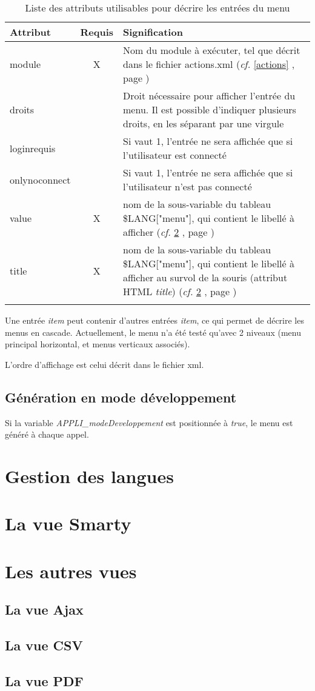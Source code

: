 \begin{longtable}{|p{2.5cm}|c|p{9cm}|}
\hline
\textbf{Attribut} & \textbf{Requis} & \textbf{Signification} \\
\hline
\endhead
module & X & Nom du module à exécuter, tel que décrit dans le fichier actions.xml (\textit{cf.} \ref{actions} \textit{\nameref{actions}}, page \pageref{actions})\\
 \hline
droits & & Droit nécessaire pour afficher l'entrée du menu. Il est possible d'indiquer plusieurs droits, en les séparant par une virgule\\
 \hline
loginrequis & & Si vaut 1, l'entrée ne sera affichée que si l'utilisateur est connecté \\
 \hline
onlynoconnect & & Si vaut 1, l'entrée ne sera affichée que si l'utilisateur n'est pas connecté\\
 \hline
value & X & nom de la sous-variable du tableau \$LANG["menu"], qui contient le libellé à afficher (\textit{cf.} \ref{langue} \textit{\nameref{langue}}, page \pageref{langue})\\
 \hline
title & X & nom de la sous-variable du tableau  \$LANG["menu"], qui contient le libellé à afficher au survol de la souris (attribut HTML \textit{title})  (\textit{cf.} \ref{langue} \textit{\nameref{langue}}, page \pageref{langue})\\
 \hline

\caption{Liste des attributs utilisables pour décrire les entrées du menu}
\end{longtable}

Une entrée \textit{item} peut contenir d'autres entrées \textit{item}, ce qui permet de décrire les menus en cascade. Actuellement, le menu n'a été testé qu'avec 2 niveaux (menu principal horizontal, et menus verticaux associés).

L'ordre d'affichage est celui décrit dans le fichier xml.

\section{Génération en mode développement}

Si la variable \textit{APPLI\_modeDeveloppement} est positionnée à \textit{true}, le menu est généré à chaque appel.

\chapter{Gestion des langues}\label{langue}



\chapter{La vue Smarty}\label{smarty}

\chapter{Les autres vues}
\section{La vue Ajax}
\section{La vue CSV}
\section{La vue PDF}
